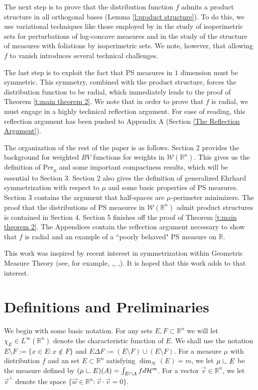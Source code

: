 \documentclass[12pt]{amsart}
\numberwithin{equation}{section}
\theoremstyle{plain}
\theoremstyle{definition}
\newcommand{\res}{\hbox{ {\vrule height .22cm}{\leaders\hrule\hskip.2cm} }}
\begin{document}
The next step is to prove that the distribution function $f$ admits a product structure in all orthogonal bases (Lemma \ref{l:product structure}).  To do this, we use variational techniques like those employed by \cite{Rosales14} in the study of isoperimetric sets for perturbations of log-concave measures and \cite{BrockChiacchioMercaldo12}\cite{BrockChiacchio16} in the study of the structure of measures with foliations by isoperimetric sets. We note, however, that allowing $f$ to vanish introduces several technical challenges.

The last step is to exploit the fact that PS measures in $1$ dimension must be symmetric.  This symmetry, combined with the product structure, forces the distribution function to be radial, which immediately leads to the proof of Theorem \ref{t:main theorem 2}.  We note that in order to prove that $f$ is radial, we must engage in a highly technical reflection argument. For ease of reading, this reflection argument has been pushed to Appendix A (Section \ref{The Reflection Argument}).

The organization of the rest of the paper is as follows.  Section 2 provides the background for weighted $BV$ functions for weights in $\mathscr{W}(\mathbb{R}^n)$.  This gives us the definition of $\text{Per}_{\mu}$ and some important compactness results, which will be essential to Section 3.  Section 2 also gives the definition of generalized Ehrhard symmetrization with respect to $\mu$ and some basic properties of PS measures. Section 3 contains the argument that half-spaces are $\mu$-perimeter minimizers. The proof that the distributions of PS measures in $\mathscr{W}(\mathbb{R}^n)$ admit product structures is contained in Section 4. Section 5 finishes off the proof of Theorem \ref{t:main theorem 2}.  The Appendices contain the reflection argument necessary to show that $f$ is radial and an example of a ``poorly behaved" PS measure on $\mathbb{R}$.

This work was inspired by recent interest in symmetrization within Geometric Measure Theory (see, for example, \cite{Chlebk2005ThePI},\cite{Barchiesi2013}, \cite{CianchiFuscoMaggiPratelli11},\cite{CagnettiColomboDePhilippis17}). It is hoped that this work adds to that interest.

\section{Definitions and Preliminaries}

We begin with some basic notation. For any sets $E, F \subset \mathbb{R}^n$ we will let $\chi_{E} \in L^{\infty}(\mathbb{R}^n)$ denote the characteristic function of $E$. We shall use the notation $E \setminus F:= \{x \in E: x\not \in F \}$ and $E \Delta F := (E \setminus F) \cup (E \setminus F)$. For a measure $\mu$ with distribution $f$  and an set $E \subset \mathbb{R}^n$ satisfying $\dim_{\mathcal{H}}(E) = m$, we let $\mu \res E$ be the measure defined by $(\mu \res E)(A) = \int_{E \cap A} f d\mathcal{H}^m$.  For a vector $\vec{v} \in \mathbb{R}^n$, we let $\vec{v}^{\perp}$ denote the space $\{\vec{w} \in \mathbb{R}^n: \vec{v} \cdot \vec{v} = 0 \}$.
\end{document}
